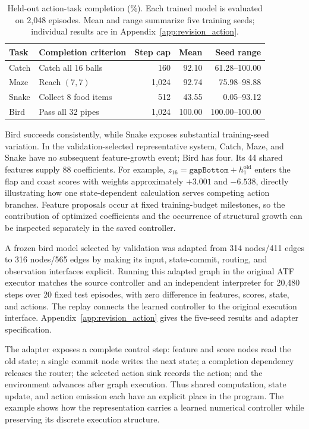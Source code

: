 \begin{table}[tb]
\centering\small
\caption{Held-out action-task completion (\%). Each trained model is evaluated on 2,048 episodes. Mean and range summarize five training seeds; individual results are in Appendix~\ref{app:revision_action}.}
\label{tab:action_main}
\begin{tabular}{llrrr}
\toprule
Task & Completion criterion & Step cap & Mean & Seed range \\
\midrule
Catch & Catch all 16 balls & 160 & 92.10 & 61.28--100.00 \\
Maze & Reach $(7,7)$ & 1,024 & 92.74 & 75.98--98.88 \\
Snake & Collect 8 food items & 512 & 43.55 & 0.05--93.12 \\
Bird & Pass all 32 pipes & 1,024 & 100.00 & 100.00--100.00 \\
\bottomrule
\end{tabular}
\end{table}

Bird succeeds consistently, while Snake exposes substantial training-seed variation. In the validation-selected representative system, Catch, Maze, and Snake have no subsequent feature-growth event; Bird has four. Its 44 shared features supply 88 coefficients. For example, $z_{16}=\texttt{gapBottom}+h^{\mathrm{old}}_1$ enters the flap and coast scores with weights approximately $+3.001$ and $-6.538$, directly illustrating how one state-dependent calculation serves competing action branches. Feature proposals occur at fixed training-budget milestones, so the contribution of optimized coefficients and the occurrence of structural growth can be inspected separately in the saved controller.

A frozen bird model selected by validation was adapted from 314 nodes/411 edges to 316 nodes/565 edges by making its input, state-commit, routing, and observation interfaces explicit. Running this adapted graph in the original ATF executor matches the source controller and an independent interpreter for 20,480 steps over 20 fixed test episodes, with zero difference in features, scores, state, and actions. The replay connects the learned controller to the original execution interface. Appendix~\ref{app:revision_action} gives the five-seed results and adapter specification.

The adapter exposes a complete control step: feature and score nodes read the old state; a single commit node writes the next state; a completion dependency releases the router; the selected action sink records the action; and the environment advances after graph execution. Thus shared computation, state update, and action emission each have an explicit place in the program. The example shows how the representation carries a learned numerical controller while preserving its discrete execution structure.

